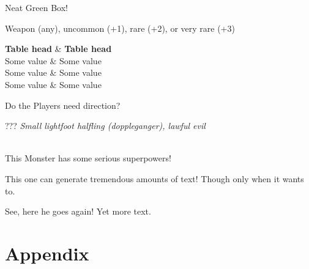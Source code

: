 \documentclass[10pt,twoside,twocolumn,openany]{book}
\begin{document}
\newpage

\begin{commentbox}{Neat Green Box!}
	\lipsum[1]
\end{commentbox}

{Weapon (any), uncommon (+1), rare (+2), or very rare (+3)}

\newpage %

\begin{dndtable}
	   \textbf{Table head}  & \textbf{Table head} \\
	   Some value  & Some value \\
	   Some value  & Some value \\
	   Some value  & Some value
\end{dndtable}

\begin{paperbox}{Do the Players need direction?}
	\lipsum[1]
\end{paperbox}

\begin{monsterbox}{???}
	\textit{Small lightfoot halfling (doppleganger), lawful evil}\\
	\hline
	\basics[%
	armorclass = 13,
	hitpoints  = 13,
	speed      = 20 ft
	]
	\hline
	\stats[
	STR = \stat{12}, %
	DEX = \stat{14},
	CON = \stat{10},
	INT = \stat{13},
	WIS = \stat{12},
	CHA = \stat{20}
	]
	\hline
	\details[%
	senses = {Darkvision 60 ft},
	languages = {Common, Erlang},
	conditionimmunities = {Charmed},
	]
	\hline \\[1mm]
	\begin{monsteraction}
		This Monster has some serious superpowers!
	\end{monsteraction}
	\begin{monsteraction}
		This one can generate tremendous amounts of text! Though only when it wants to.
	\end{monsteraction}

	\begin{monsteraction}
	See, here he goes again! Yet more text.
	\end{monsteraction}
\end{monsterbox}

\clearpage

\chapter{Appendix}





\clearpage

\onecolumn
\renewcommand{\bibname}{References}
{}


\end{document}
